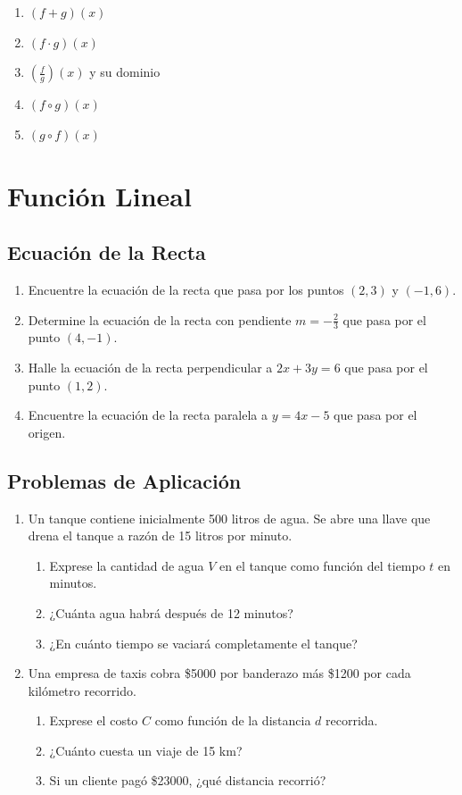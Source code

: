 \documentclass[12pt,a4paper]{article}
\begin{document}
\begin{enumerate}
    \item $(f + g)(x)$
    \item $(f \cdot g)(x)$
    \item $\left(\frac{f}{g}\right)(x)$ y su dominio
    \item $(f \circ g)(x)$
    \item $(g \circ f)(x)$
\end{enumerate}

\section{Función Lineal}

\subsection{Ecuación de la Recta}
\begin{enumerate}
    \item Encuentre la ecuación de la recta que pasa por los puntos $(2, 3)$ y $(-1, 6)$.
    \item Determine la ecuación de la recta con pendiente $m = -\frac{2}{3}$ que pasa por el punto $(4, -1)$.
    \item Halle la ecuación de la recta perpendicular a $2x + 3y = 6$ que pasa por el punto $(1, 2)$.
    \item Encuentre la ecuación de la recta paralela a $y = 4x - 5$ que pasa por el origen.
\end{enumerate}

\subsection{Problemas de Aplicación}
\begin{enumerate}
    \item Un tanque contiene inicialmente 500 litros de agua. Se abre una llave que drena el tanque a razón de 15 litros por minuto.
    \begin{enumerate}
        \item Exprese la cantidad de agua $V$ en el tanque como función del tiempo $t$ en minutos.
        \item ¿Cuánta agua habrá después de 12 minutos?
        \item ¿En cuánto tiempo se vaciará completamente el tanque?
    \end{enumerate}
    
    \item Una empresa de taxis cobra \$5000 por banderazo más \$1200 por cada kilómetro recorrido.
    \begin{enumerate}
        \item Exprese el costo $C$ como función de la distancia $d$ recorrida.
        \item ¿Cuánto cuesta un viaje de 15 km?
        \item Si un cliente pagó \$23000, ¿qué distancia recorrió?
    \end{enumerate}
\end{enumerate}
\end{document}
